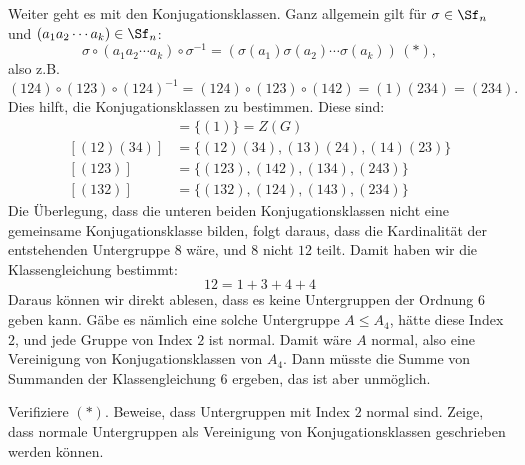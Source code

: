 \begin{beispiel}
\begin{center}
\end{center}
Weiter geht es mit den Konjugationsklassen. Ganz allgemein gilt für $\sigma \in \Sf_n$ und $(a_1 a_2 \cdots a_k) \in \Sf_n$:
\begin{equation}
\sigma \circ (a_1a_2 \cdots a_k) \circ \sigma^{-1} = \left(\sigma (a_1) \sigma (a_2) \cdots \sigma (a_k) \right) \, (\ast),
\end{equation}
also z.B. 
\begin{equation}
(124) \circ (123) \circ (124)^{-1} = (124) \circ (123)\circ (142) = (1)(234) = (234).
\end{equation}
Dies hilft, die Konjugationsklassen zu bestimmen. Diese sind:
\begin{align}
[(1)]&=\{(1)\} = Z(G)\\
[(12)(34)]&=\{(12)(34), (13)(24),(14)(23)\}\\
[(123)]&=\{(123), (142), (134), (243)\}\\
[(132)] &= \{(132), (124), (143), (234)\}
\end{align}
Die Überlegung, dass die unteren beiden Konjugationsklassen nicht eine gemeinsame Konjugationsklasse bilden, folgt daraus, dass die Kardinalität der entstehenden Untergruppe $8$ wäre, und $8$ nicht $12$ teilt. Damit haben wir die Klassengleichung bestimmt:
\begin{equation}
12 = 1+3+4+4
\end{equation}
Daraus können wir direkt ablesen, dass es keine Untergruppen der Ordnung $6$ geben kann. Gäbe es nämlich eine solche Untergruppe $A \leq A_4$, hätte diese Index $2$, und jede Gruppe von Index $2$ ist normal. Damit wäre $A$ normal, also eine Vereinigung von Konjugationsklassen von $A_4$. Dann müsste die Summe von Summanden der Klassengleichung $6$ ergeben, das ist aber unmöglich.
\end{beispiel}
\begin{übung}
Verifiziere $(\ast)$. Beweise, dass Untergruppen mit Index $2$ normal sind. Zeige, dass normale Untergruppen als Vereinigung von Konjugationsklassen geschrieben werden können.
\end{übung}
